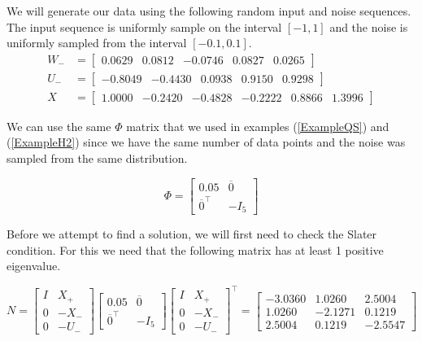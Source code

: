 We will generate our data using the following random input and noise sequences. The input sequence is uniformly sample on the interval $[-1,1]$ and the noise is uniformly sampled from the interval $[-0.1, 0.1]$.
\begin{align*}
	W_- &= \begin{bmatrix}  0.0629 &   0.0812 &  -0.0746 &   0.0827 &   0.0265 \end{bmatrix} \\
	U_- &= \begin{bmatrix} -0.8049 &  -0.4430 &   0.0938 &   0.9150 &   0.9298 \end{bmatrix} \\
	X   &= \begin{bmatrix}  1.0000 &  -0.2420 &  -0.4828 &  -0.2222 &   0.8866  &  1.3996 \end{bmatrix}
\end{align*}

We can use the same $\Phi$ matrix that we used in examples (\ref{ExampleQS}) and (\ref{ExampleH2}) since we have the same number of data points and the noise was sampled from the same distribution. 

\begin{equation*}
\Phi = \begin{bmatrix} 0.05 & \overline{0} \\ \overline{0}^\top & -I_5 \end{bmatrix}
\end{equation*}

Before we attempt to find a solution, we will first need to check the Slater condition. For this we need that the following matrix has at least 1 positive eigenvalue.

\begin{equation*}
N = 
\begin{bmatrix} I&X_+ \\ 0 & -X_- \\ 0&-U_- \end{bmatrix}
\begin{bmatrix} 0.05 & \overline{0} \\ \overline{0}^\top & -I_5 \end{bmatrix}
\begin{bmatrix} I&X_+ \\ 0 & -X_- \\ 0&-U_- \end{bmatrix}^\top 
=
\begin{bmatrix} 
	-3.0360 &   1.0260 &   2.5004 \\
 	 1.0260 &  -2.1271 &   0.1219 \\
 	 2.5004 &   0.1219 &  -2.5547
\end{bmatrix} 
\end{equation*}

